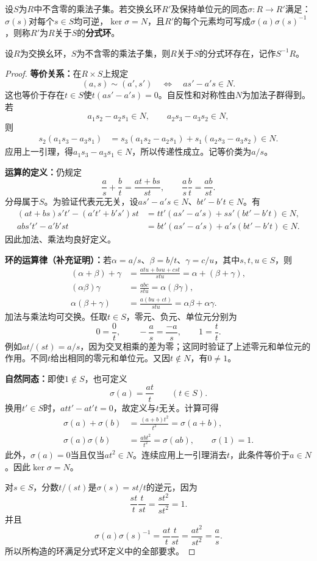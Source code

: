 \begin{definition}
设$S$为$R$中不含零的乘法子集。若交换幺环$R'$及保持单位元的同态$\sigma:R\to R'$满足：$\sigma(s)$对每个$s\in S$均可逆，$\ker\sigma=N$，且$R'$的每个元素均可写成$\sigma(a)\sigma(s)^{-1}$，则称$R'$为$R$关于$S$的\textbf{分式环}。
\end{definition}

\begin{theorem}\label{p2:localization-existence}
设$R$为交换幺环，$S$为不含零的乘法子集，则$R$关于$S$的分式环存在，记作$S^{-1}R$。
\end{theorem}
\begin{proof}
\textbf{等价关系：}在$R\times S$上规定
\[
(a,s)\sim(a',s')\quad\Longleftrightarrow\quad as'-a's\in N.
\]
这也等价于存在$t\in S$使$t(as'-a's)=0$。自反性和对称性由$N$为加法子群得到。若
\[
a_1s_2-a_2s_1\in N,\qquad a_2s_3-a_3s_2\in N,
\]
则
\begin{align*}
s_2(a_1s_3-a_3s_1)
&=s_3(a_1s_2-a_2s_1)+s_1(a_2s_3-a_3s_2)\in N.
\end{align*}
应用上一引理，得$a_1s_3-a_3s_1\in N$，所以传递性成立。记等价类为$a/s$。

\textbf{运算的定义：}仍规定
\[
\frac as+\frac bt=\frac{at+bs}{st},\qquad
\frac as\frac bt=\frac{ab}{st}.
\]
分母属于$S$。为验证代表元无关，设$as'-a's\in N$、$bt'-b't\in N$。有
\begin{align*}
(at+bs)s't'-(a't'+b's')st
&=tt'(as'-a's)+ss'(bt'-b't)\in N,\\
ab s't'-a'b'st
&=bt'(as'-a's)+a's(bt'-b't)\in N.
\end{align*}
因此加法、乘法均良好定义。

\textbf{环的运算律（补充证明）：}若$\alpha=a/s$、$\beta=b/t$、$\gamma=c/u$，其中$s,t,u\in S$，则
\begin{align*}
(\alpha+\beta)+\gamma&=\frac{atu+bsu+cst}{stu}=\alpha+(\beta+\gamma),\\
(\alpha\beta)\gamma&=\frac{abc}{stu}=\alpha(\beta\gamma),\\
\alpha(\beta+\gamma)&=\frac{a(bu+ct)}{stu}=\alpha\beta+\alpha\gamma.
\end{align*}
加法与乘法均可交换。任取$t\in S$，零元、负元、单位元分别为
\[
0=\frac0t,\qquad -\frac as=\frac{-a}{s},\qquad 1=\frac tt.
\]
例如$at/(st)=a/s$，因为交叉相乘的差为零；这同时验证了上述零元和单位元的作用。不同$t$给出相同的零元和单位元。又因$t\notin N$，有$0\ne1$。

\textbf{自然同态：}即使$1\notin S$，也可定义
\[
\sigma(a)=\frac{at}{t}\qquad(t\in S).
\]
换用$t'\in S$时，$att'-at't=0$，故定义与$t$无关。计算可得
\begin{align*}
\sigma(a)+\sigma(b)&=\frac{(a+b)t^2}{t^2}=\sigma(a+b),\\
\sigma(a)\sigma(b)&=\frac{abt^2}{t^2}=\sigma(ab),\qquad \sigma(1)=1.
\end{align*}
此外，$\sigma(a)=0$当且仅当$at^2\in N$。连续应用上一引理消去$t$，此条件等价于$a\in N$。因此$\ker\sigma=N$。

对$s\in S$，分数$t/(st)$是$\sigma(s)=st/t$的逆元，因为
\[
\frac{st}{t}\frac{t}{st}=\frac{st^2}{st^2}=1.
\]
并且
\[
\sigma(a)\sigma(s)^{-1}
=\frac{at}{t}\frac{t}{st}
=\frac{at^2}{st^2}=\frac as.
\]
所以所构造的环满足分式环定义中的全部要求。
\end{proof}

